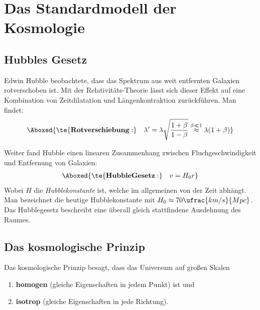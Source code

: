 \documentclass[final]{summery_5.0}
\begin{document}
\section{Das Standardmodell der Kosmologie}
\subsection{Hubbles Gesetz}
Edwin Hubble beobachtete, dass das Spektrum aus weit entfernten Galaxien rotverschoben ist. Mit der Relativitäts-Theorie lässt sich dieser Effekt auf eine Kombination von Zeitdilatation und Längenkontraktion zurückführen. Man findet:
\begin{align*}
    \Aboxed{\te{\bf Rotverschiebung:}\quad \lambda' = \lambda\sqrt{\frac{1+\beta}{1-\beta}} \overset{\beta\ll 1}{\approx } \lambda (1+\beta)}
\end{align*}

Weiter fand Hubble einen linearen Zusammenhang zwischen Fluchgeschwindigkeit und Entfernung von Galaxien:
\begin{align*}
    \Aboxed{\te{\bf Hubble Gesetz:} \quad v = H_0 r}
\end{align*}
Wobei $H$ die \emph{Hubblekonstante} ist, welche im allgemeinen von der Zeit abhängt. Man bezeichnet die heutige Hubblekonstante mit $H_0 \approx 70 \ufrac{km/s}{Mpc}$. Das Hubblegesetz beschreibt eine überall gleich stattfindene Ausdehnung des Raumes.

\subsection{Das kosmologische Prinzip}
Das kosmologische Prinzip besagt, dass das Universum auf großen Skalen
\begin{enumerate}
    \item {\bf homogen} (gleiche Eigenschaften in jedem Punkt) ist und
    \item {\bf isotrop} (gleiche Eigenschaften in jede Richtung).
\end{enumerate}
\end{document}
